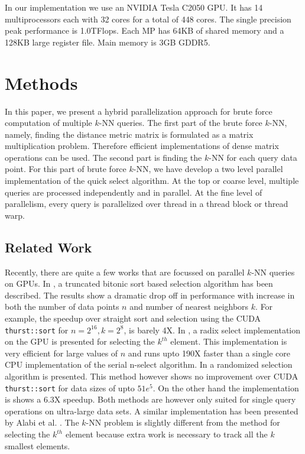 \documentclass[10pt]{article}
\begin{document}
In our implementation we use an NVIDIA Tesla C2050 GPU. It has 14 multiprocessors each with 32 cores for a total of 448 cores. The single precision peak performance is 1.0TFlops. Each MP has 64KB of shared memory and a 128KB large register file. Main memory is 3GB GDDR5. 


\section*{Methods}
In this paper, we present a hybrid parallelization approach for brute force computation of multiple $k$-NN queries. The first part of the brute force $k$-NN, namely, finding the distance metric matrix is formulated as a matrix multiplication problem. Therefore efficient implementations of dense matrix operations can be used. The second part is finding the $k$-NN for each query data point.  For this part of brute force $k$-NN, we have develop a two level parallel implementation of the quick select algorithm. At the top or coarse level, multiple queries are processed independently and in parallel. At the fine level of parallelism, every query is parallelized over thread in a thread block or thread warp. \\





\subsection*{Related Work}
Recently, there are quite a few works that are focussed on parallel $k$-NN queries on GPUs. In \cite{Sismanis:2012}, a truncated bitonic sort based selection algorithm has been described. The results show a dramatic drop off in performance with increase in both  the number of data points $n$ and number of nearest neighbors $k$. For example, the speedup over straight sort and selection using the CUDA \texttt{thurst::sort} for $n=2^{16}, k=2^8$, is barely 4X. In \cite{Baxter:2011}, a radix select implementation on the GPU is presented for selecting the $k^{th}$ element. This implementation is very efficient for large values of $n$ and runs upto 190X faster than a single core CPU implementation of the serial n-select algorithm. In \cite{Monroe:2011} a randomized selection algorithm is presented. This method however shows no improvement over CUDA \texttt{thurst::sort} for data sizes of upto $51e^5$. On the other hand the implementation is \cite{Baxter:2011} shows a 6.3X speedup. Both methods are however only suited for single query operations on ultra-large data sets. A similar implementation has been presented by  Alabi et al. \cite{Alabi:2012}.  The $k$-NN problem is slightly different from the method for selecting the $k^{th}$ element because extra work is necessary to track all the $k$ smallest elements. \\
\end{document}
